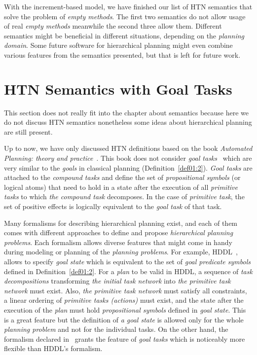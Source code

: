 \medskip\noindent
With the increment-based model, we have finished our list of HTN semantics that solve the problem of \emph{empty methods}. The first two semantics do not allow usage of real \emph{empty methods} meanwhile the second three allow them. Different semantics might be beneficial in different situations, depending on the \emph{planning domain}. Some future software for hierarchical planning might even combine various features from the semantics presented, but that is left for future work.
 
\section{{HTN} Semantics with Goal Tasks}

\medskip\noindent
This section does not really fit into the chapter about semantics because here we do not discuss HTN semantics nonetheless some ideas about hierarchical planning are still present.

\medskip\noindent
Up to now, we have only discussed HTN definitions based on the book \emph{Automated Planning: theory and practice}~\cite{nau}. This book does not consider \emph{goal tasks}~\cite{complexity} which are very similar to the \emph{goals} in classical planning (Definition~\ref{def01:2}). \emph{Goal tasks} are attached to the \emph{compound tasks} and define the set of \emph{propositional symbols} (or logical atoms) that need to hold in a state after the execution of all \emph{primitive tasks} to which \emph{the compound task} decomposes. In the case of \emph{primitive task}, the set of positive effects is logically equivalent to the \emph{goal task} of that task. 

\medskip\noindent
Many formalisms for describing hierarchical planning exist, and each of them comes with different approaches to define and propose \emph{hierarchical planning problems}. Each formalism allows diverse features that might come in handy during modeling or planning of the \emph{planning problems}. For example, HDDL~\cite{hddl}, allows to specify \emph{goal state} which is equivalent to the set of \emph{goal predicate symbols} defined in Definition~\ref{def01:2}. For a \emph{plan} to be valid in HDDL, a sequence of \emph{task decompositions} transforming \emph{the initial task network} into \emph{the primitive task network} must exist. Also, \emph{the primitive task network} must satisfy all constraints, a linear ordering of \emph{primitive tasks (actions)} must exist, and the state after the execution of the \emph{plan} must hold \emph{propositional symbols} defined in \emph{goal state}. This is a great feature but the definition of \emph{a goal state} is allowed only for the whole \emph{planning problem} and not for the individual tasks. On the other hand, the formalism declared in~\cite{complexity} grants the feature of \emph{goal tasks} which is noticeably more flexible than HDDL's formalism.


